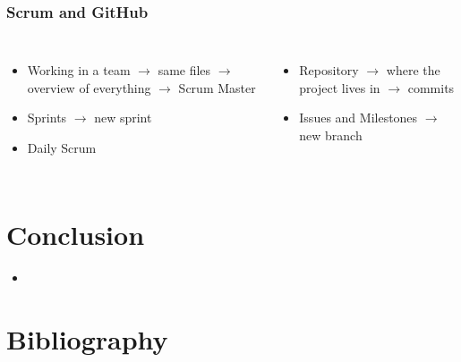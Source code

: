 \documentclass{beamer}
\begin{document}
\begin{frame}
    \frametitle{Scrum and GitHub}
        \begin{columns}
            \center {}
            \begin{itemize}
            \item<1-> Working in a team \linebreak
            $\rightarrow$ same files \linebreak
            $\rightarrow$ overview of everything \linebreak
            $\rightarrow$ Scrum Master
            \item<3-> Sprints \linebreak
            $\rightarrow$ new sprint
            \item<5-> Daily Scrum
            \end{itemize}
            
            \center {}
            \begin{itemize}
            \item<2-> Repository \linebreak
            $\rightarrow$ where the project lives in \linebreak
            $\rightarrow$ commits \linebreak
            \item<4-> Issues and Milestones \linebreak
            $\rightarrow$ new branch \linebreak
            \end{itemize}
        \end{columns}
        \medskip
\end{frame}


\section{Conclusion}

\begin{frame}
	\begin{itemize}
		\item 
	\end{itemize}
\end{frame}


\section{Bibliography}
\end{document}
